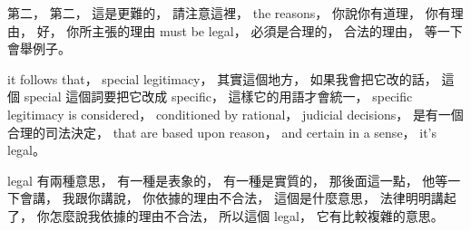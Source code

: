 \hypertarget{w02:cue:1417}{}第二，
\hypertarget{w02:cue:1418}{}第二，
\hypertarget{w02:cue:1419}{}這是更難的，
\hypertarget{w02:cue:1420}{}請注意這裡，
\hypertarget{w02:cue:1421}{}the reasons，
\hypertarget{w02:cue:1422}{}你說你有道理，
\hypertarget{w02:cue:1423}{}你有理由，
\hypertarget{w02:cue:1424}{}好，
\hypertarget{w02:cue:1425}{}你所主張的理由 must be legal，
\hypertarget{w02:cue:1426}{}必須是合理的，
\hypertarget{w02:cue:1427}{}合法的理由，
\hypertarget{w02:cue:1428}{}等一下會舉例子。

\hypertarget{w02:cue:1429}{}it follows that，
\hypertarget{w02:cue:1430}{}special legitimacy，
\hypertarget{w02:cue:1431}{}其實這個地方，
\hypertarget{w02:cue:1432}{}如果我會把它改的話，
\hypertarget{w02:cue:1433}{}這個 special 這個詞要把它改成 specific，
\hypertarget{w02:cue:1434}{}這樣它的用語才會統一，
\hypertarget{w02:cue:1435}{}specific legitimacy is considered，
\hypertarget{w02:cue:1436}{}conditioned by rational，
\hypertarget{w02:cue:1437}{}judicial decisions，
\hypertarget{w02:cue:1438}{}是有一個合理的司法決定，
\hypertarget{w02:cue:1439}{}that are based upon reason，
\hypertarget{w02:cue:1440}{}and certain in a sense，
\hypertarget{w02:cue:1441}{}it's legal。

\hypertarget{w02:cue:1442}{}legal 有兩種意思，
\hypertarget{w02:cue:1443}{}有一種是表象的，
\hypertarget{w02:cue:1444}{}有一種是實質的，
\hypertarget{w02:cue:1445}{}那後面這一點，
\hypertarget{w02:cue:1446}{}他等一下會講，
\hypertarget{w02:cue:1447}{}我跟你講說，
\hypertarget{w02:cue:1448}{}你依據的理由不合法，
\hypertarget{w02:cue:1449}{}這個是什麼意思，
\hypertarget{w02:cue:1450}{}法律明明講起了，
\hypertarget{w02:cue:1451}{}你怎麼說我依據的理由不合法，
\hypertarget{w02:cue:1452}{}所以這個 legal，
\hypertarget{w02:cue:1453}{}它有比較複雜的意思。

